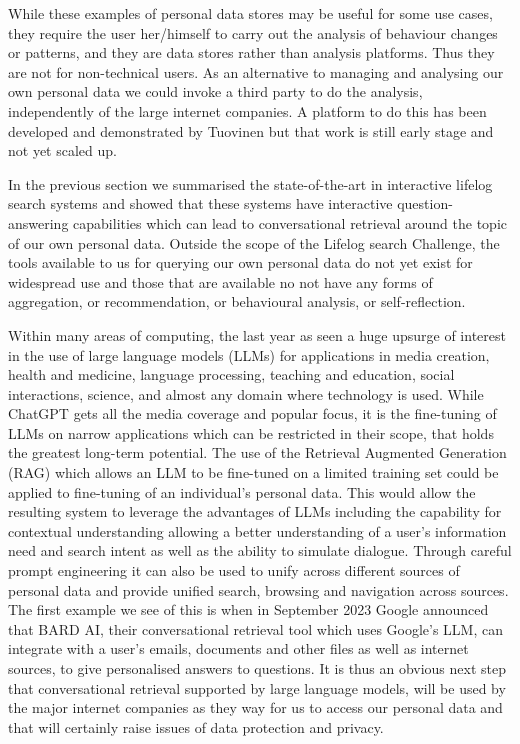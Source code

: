 \documentclass[11pt]{article}
\begin{document}
\noindent 
While these examples of personal data stores may be useful for some use cases, they require the user her/himself to carry out the analysis of behaviour changes or patterns, and they are data stores rather than analysis platforms.  Thus they are not for non-technical users.
As an alternative to managing and analysing our own personal data we could invoke a third party to do the analysis, independently of the large internet companies. A platform to do this has been developed and demonstrated by Tuovinen \cite{tuovinen2022privacy} but that work is still early stage and not yet scaled up.

In the previous section we summarised the state-of-the-art in interactive lifelog search systems and showed that these systems have interactive question-answering capabilities which can lead to conversational retrieval around the topic of our own personal data. Outside the scope of the Lifelog search Challenge, the tools available to us for querying our own personal data do not yet exist for widespread use and those that are available no not have any forms of aggregation, or recommendation, or behavioural analysis, or self-reflection.


Within many areas of computing, the last year as seen a huge upsurge of interest in the use of large language models (LLMs) for applications in media creation, health and medicine, language processing, teaching and education, social interactions, science, and almost any domain where technology is used. While ChatGPT gets all the media coverage and popular focus, it is the fine-tuning of LLMs  on narrow applications which can be restricted in their scope, that holds the greatest long-term potential. The use of the Retrieval Augmented Generation (RAG) \cite{lewis2020retrieval} which allows an LLM to be fine-tuned on a limited training set could be applied to fine-tuning of an individual's personal data. This would allow the resulting system to leverage the advantages of LLMs including the capability for contextual understanding allowing a better understanding of a user's information need and search intent as well as the ability to simulate dialogue. Through careful prompt engineering it can also be used to unify across different sources of personal data and provide unified search, browsing and navigation across sources.  The first example we see of this is when in September 2023 Google announced that BARD AI, their conversational retrieval tool which uses Google's LLM, can integrate with a user’s emails, documents and other files as well as internet sources,  to give personalised answers to questions. It is thus an obvious next step that conversational retrieval supported by large language models, will be used by the major internet companies as they way for us to  access our personal data and that will certainly raise issues of data protection and privacy.
\end{document}
